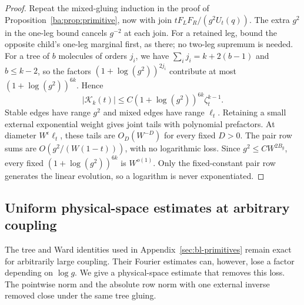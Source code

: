 \documentclass[11pt]{article}
\numberwithin{equation}{section}
\theoremstyle{remark}
\newcommand{\cK}{\mathcal K}
\begin{document}
\begin{proof}
Repeat the mixed-gluing induction in the proof of
Proposition~\ref{ba:prop:primitive}, now with join
$tF_LF_R/(g^2U_t(q))$. The extra $g^2$ in the one-leg bound cancels
$g^{-2}$ at each join. For a retained leg, bound the opposite child's
one-leg marginal first, as there; no two-leg supremum is needed.
For a tree of $b$ molecules of orders $j_i$, we have
$\sum_i j_i=k+2(b-1)$ and $b\le k-2$, so the factors
$(1+\log(g^2))^{2j_i}$ contribute at most
$(1+\log(g^2))^{6k}$. Hence
\begin{equation}\label{ll:eq:primitive}
 |\cK_k(t)|\le C(1+\log(g^2))^{6k}\zeta_t^{k-1}.
\end{equation}
Stable edges have range \(g^2\) and mixed edges have range \(\ell_t\).
Retaining a small external exponential weight gives joint tails with
polynomial prefactors. At diameter \(W^\epsilon\ell_t\), these tails are
\(O_D(W^{-D})\) for every fixed \(D>0\). The pair row sums are
\(O(g^2/(W(1-t)))\), with no logarithmic loss.
Since \(g^2\le CW^{2B_g}\), every fixed \((1+\log(g^2))^{6k}\) is
\(W^{o(1)}\). Only the fixed-constant pair row
generates the linear evolution, so a logarithm is never exponentiated.
\end{proof}

\subsection{Uniform physical-space estimates at arbitrary coupling}\label{app:uniform-profile}
The tree and Ward identities used in Appendix~\ref{sec:bl-primitives}
remain exact for arbitrarily large coupling. Their Fourier estimates can,
however, lose a factor depending on $\log g$. We give a physical-space
estimate that removes this loss. The pointwise norm and the absolute row
norm with one external inverse removed close under the same tree gluing.
\end{document}
